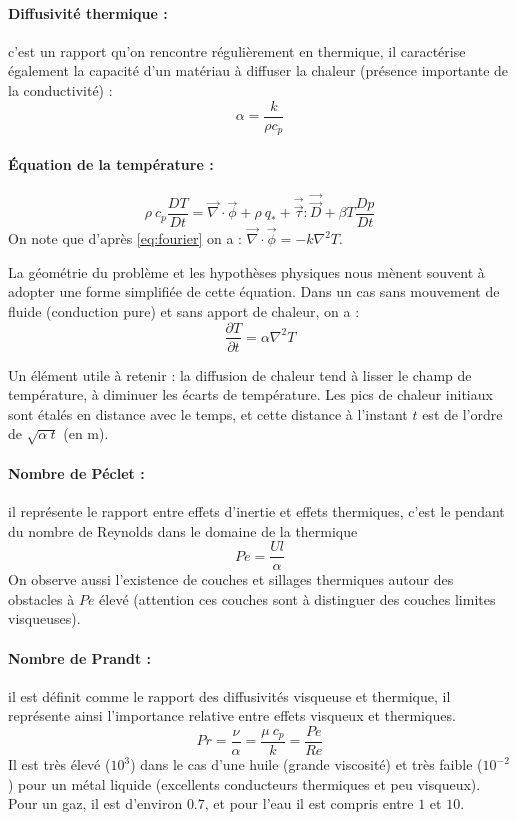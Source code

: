 \paragraph{Diffusivité thermique :}c'est un rapport qu'on rencontre régulièrement en thermique, il caractérise également la capacité d'un matériau à diffuser la chaleur (présence importante de la conductivité) :
%
\begin{equation}
\alpha = \frac{k}{\rho c_p}
\end{equation}


\paragraph{Équation de la température :}
%
\begin{equation}
\rho~c_p \frac{DT}{Dt}
= \vec{\nabla} \cdot \vec{\phi} %
+ \rho~q_*
+ \vec{\vec{\tau}} : \vec{\vec{D}}
+ \beta T\frac{Dp}{Dt}
\end{equation}
%
On note que d'après \eqref{eq:fourier} on a : $\vec{\nabla} \cdot \vec{\phi} = - k \nabla^2 T$.

La géométrie du problème et les hypothèses physiques nous mènent souvent à adopter une forme simplifiée de cette équation. Dans un cas sans mouvement de fluide (conduction pure) et sans apport de chaleur, on a :
%
\begin{equation}
\frac{\partial T}{\partial t}
= \alpha \nabla^2 T
\end{equation}

Un élément utile à retenir : la diffusion de chaleur tend à lisser le champ de température, à diminuer les écarts de température. Les pics de chaleur initiaux sont étalés en distance avec le temps, et cette distance à l'instant $t$ est de l'ordre de $\sqrt{\alpha~t}$ (en m).


\paragraph{Nombre de Péclet :}il représente le rapport entre effets d'inertie et effets thermiques, c'est le pendant du nombre de Reynolds dans le domaine de la thermique
%
\begin{equation}
Pe = \frac{Ul}{\alpha}
\end{equation}
%
On observe aussi l'existence de couches et sillages thermiques autour des obstacles à $Pe$ élevé (attention ces couches sont à distinguer des couches limites visqueuses).

\paragraph{Nombre de Prandt :}il est définit comme le rapport des diffusivités visqueuse et thermique, il représente ainsi l'importance relative entre effets visqueux et thermiques.
%
\begin{equation}
Pr = \frac{\nu}{\alpha} = \frac{\mu~c_p}{k} = \frac{Pe}{Re}
\end{equation}
%
Il est très élevé ($10^3$) dans le cas d'une huile (grande viscosité) et très faible ($10^{-2}$) pour un métal liquide (excellents conducteurs thermiques et peu visqueux). Pour un gaz, il est d'environ $0.7$, et pour l'eau il est compris entre $1$ et $10$.


